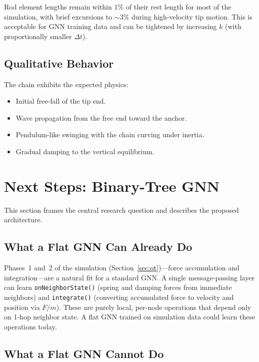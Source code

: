 \documentclass[11pt,a4paper]{article}
\begin{document}
Rod element lengths remain within $1\%$ of their rest length for most of
the simulation, with brief excursions to $\sim 3\%$ during high-velocity
tip motion. This is acceptable for GNN training data and can be tightened by
increasing $k$ (with proportionally smaller $\Delta t$).

\subsection{Qualitative Behavior}

The chain exhibits the expected physics:
\begin{itemize}
    \item Initial free-fall of the tip end.
    \item Wave propagation from the free end toward the anchor.
    \item Pendulum-like swinging with the chain curving under inertia.
    \item Gradual damping to the vertical equilibrium.
\end{itemize}

\section{Next Steps: Binary-Tree GNN}
\label{sec:tree_gnn}

This section frames the central research question and describes the proposed
architecture.

\subsection{What a Flat GNN Can Already Do}

Phases~1 and~2 of the simulation (Section~\ref{sec:qt})---force accumulation
and integration---are a natural fit for a standard GNN. A single
message-passing layer can learn \texttt{onNeighborState()} (spring and damping
forces from immediate neighbors) and \texttt{integrate()} (converting
accumulated force to velocity and position via $F/m$). These are purely local,
per-node operations that depend only on 1-hop neighbor state. A flat GNN
trained on simulation data could learn these operations today.

\subsection{What a Flat GNN Cannot Do}
\end{document}

